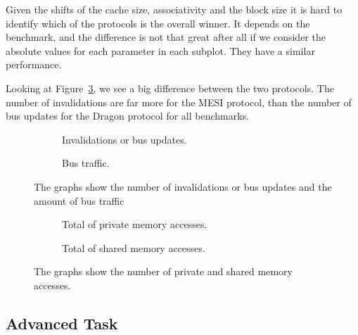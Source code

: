 Given the shifts of the cache size, associativity and the block size it is hard to
identify which of the protocols is the overall winner. It depends on the benchmark,
and the difference is not that great after all if we consider the absolute values
for each parameter in each subplot. They have a similar performance.

Looking at Figure~\ref{fig:inv_bus}, we see a big difference between the two protocols.
The number of invalidations are far more for the MESI protocol, than the number of bus
updates for the Dragon protocol for all benchmarks.



\begin{figure}[H]
    \centering
    \begin{subfigure}[b]{0.5\textwidth}
        \centering
        \caption{Invalidations or bus updates.}\label{fig:invalidations}
    \end{subfigure}%
    \hfill
    \begin{subfigure}[b]{0.5\textwidth}
        \centering
        \caption{Bus traffic.}\label{fig:bus_traffic}
    \end{subfigure}%
    \hfill
    \caption{The graphs show the number of invalidations or bus updates and the amount of bus traffic}\label{fig:inv_bus}
\end{figure}

\begin{figure}[H]
    \centering
    \begin{subfigure}[b]{0.5\textwidth}
        \centering
        \caption{Total of private memory accesses.}\label{fig:total_private_accesses}
    \end{subfigure}%
    \hfill
    \begin{subfigure}[b]{0.5\textwidth}
        \centering
        \caption{Total of shared memory accesses.}\label{fig:total_shared_accesses}
    \end{subfigure}%
    \hfill
    \caption{The graphs show the number of private and shared memory accesses.}\label{fig:accesses}
\end{figure}




\subsection{Advanced Task}\label{results:advanced}

